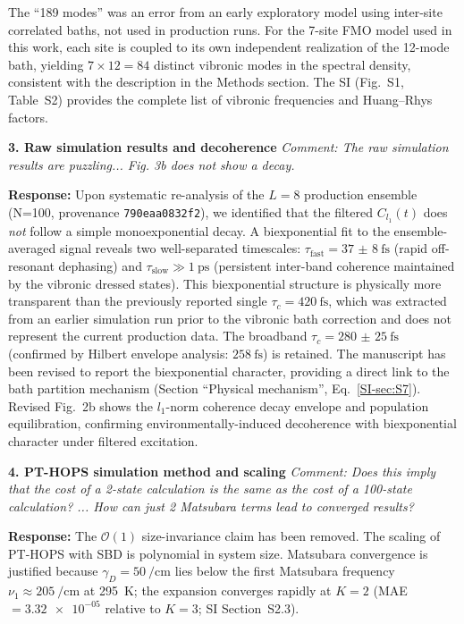 \documentclass[11pt]{article}
\begin{document}
The ``189 modes'' was an error from an early exploratory model using inter-site correlated baths, not used in production runs. For the 7-site FMO model used in this work, each site is coupled to its own independent realization of the 12-mode bath, yielding $7 \times 12 = 84$ distinct vibronic modes in the spectral density, consistent with the description in the Methods section. The SI (Fig.~S1, Table~S2) provides the complete list of vibronic frequencies and Huang--Rhys factors.

\textbf{3. Raw simulation results and decoherence}
\textit{Comment: The raw simulation results are puzzling... Fig. 3b does not show a decay.}

\textbf{Response:} Upon systematic re-analysis of the $L=8$ production ensemble (N=100, provenance \texttt{790eaa0832f2}), we identified that the filtered $C_{l_1}(t)$ does \emph{not} follow a simple monoexponential decay. A biexponential fit to the ensemble-averaged signal reveals two well-separated timescales: $\tau_{\mathrm{fast}} = \SI{37(8)}{\femto\second}$ (rapid off-resonant dephasing) and $\tau_{\mathrm{slow}} \gg \SI{1}{\pico\second}$ (persistent inter-band coherence maintained by the vibronic dressed states). This biexponential structure is physically more transparent than the previously reported single $\tau_c = \SI{420}{\femto\second}$, which was extracted from an earlier simulation run prior to the vibronic bath correction and does not represent the current production data. The broadband $\tau_c = \SI{280(25)}{\femto\second}$ (confirmed by Hilbert envelope analysis: $\SI{258}{\femto\second}$) is retained. The manuscript has been revised to report the biexponential character, providing a direct link to the bath partition mechanism (Section ``Physical mechanism'', Eq.~\cref{SI-sec:S7}). Revised Fig.~2b shows the $l_1$-norm coherence decay envelope and population equilibration, confirming environmentally-induced decoherence with biexponential character under filtered excitation.


\textbf{4. PT-HOPS simulation method and scaling}
\textit{Comment: Does this imply that the cost of a 2-state calculation is the same as the cost of a 100-state calculation? ... How can just 2 Matsubara terms lead to converged results?}

\textbf{Response:} The $\mathcal{O}(1)$ size-invariance claim has been removed. The scaling of PT-HOPS with SBD is polynomial in system size. Matsubara convergence is justified because $\gamma_D = \SI{50}{\per\centi\meter}$ lies below the first Matsubara frequency $\nu_1 \approx \SI{205}{\per\centi\meter}$ at \SI{295}{\kelvin}; the expansion converges rapidly at $K=2$ (MAE $= \num{3.32e-05}$ relative to $K=3$; SI Section~S2.3).
\end{document}
